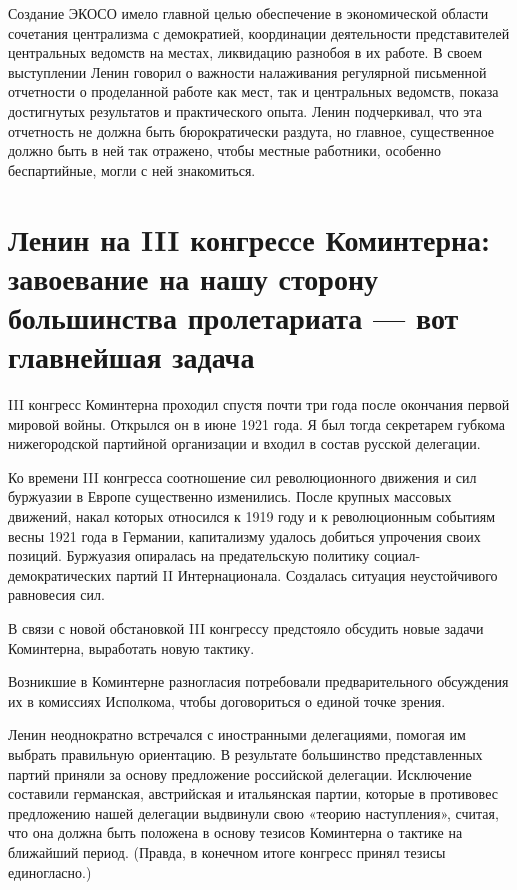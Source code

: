 \documentclass[12pt, a4paper, openany]{book}
\begin{document}
Создание ЭКОСО имело главной целью обеспечение в экономической области сочетания централизма с демократией, координации деятельности представителей центральных ведомств на местах, ликвидацию разнобоя в их работе. В своем выступлении Ленин говорил о важности налаживания регулярной письменной отчетности о проделанной работе как мест, так и центральных ведомств, показа достигнутых результатов и практического опыта. Ленин подчеркивал, что эта отчетность не должна быть бюрократически раздута, но главное, существенное должно быть в ней так отражено, чтобы местные работники, особенно беспартийные, могли с ней знакомиться.

\newpage
\section[Ленин на III конгрессе Коминтерна: завоевание на нашу сторону большинства пролетариата — вот главнейшая задача]{\center \textbf{Ленин на III конгрессе Коминтерна: завоевание на нашу сторону большинства пролетариата — вот главнейшая задача}}



III конгресс Коминтерна проходил спустя почти три года после окончания первой мировой войны. Открылся он в июне 1921 года. Я был тогда секретарем губкома нижегородской партийной организации и входил в состав русской делегации.

Ко времени III конгресса соотношение сил революционного движения и сил буржуазии в Европе существенно изменились. После крупных массовых движений, накал которых относился к 1919 году и к революционным событиям весны 1921 года в Германии, капитализму удалось добиться упрочения своих позиций. Буржуазия опиралась на предательскую политику социал-демократических партий II Интернационала. Создалась ситуация неустойчивого равновесия сил.

В связи с новой обстановкой III конгрессу предстояло обсудить новые задачи Коминтерна, выработать новую тактику.

Возникшие в Коминтерне разногласия потребовали предварительного обсуждения их в комиссиях Исполкома, чтобы договориться о единой точке зрения.

Ленин неоднократно встречался с иностранными делегациями, помогая им выбрать правильную ориентацию. В результате большинство представленных партий приняли за основу предложение российской делегации. Исключение составили германская, австрийская и итальянская партии, которые в противовес предложению нашей делегации выдвинули свою «теорию наступления», считая, что она должна быть положена в основу тезисов Коминтерна о тактике на ближайший период. (Правда, в конечном итоге конгресс принял тезисы единогласно.)
\end{document}
